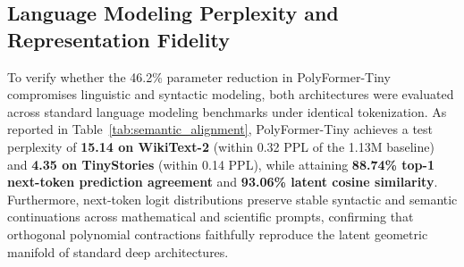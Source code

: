 \documentclass[journal,lettersize]{IEEEtran}
\begin{document}
\subsection{Language Modeling Perplexity and Representation Fidelity}
To verify whether the 46.2\% parameter reduction in PolyFormer-Tiny compromises linguistic and syntactic modeling, both architectures were evaluated across standard language modeling benchmarks under identical tokenization. As reported in Table~\ref{tab:semantic_alignment}, PolyFormer-Tiny achieves a test perplexity of \textbf{15.14 on WikiText-2} (within 0.32 PPL of the 1.13M baseline) and \textbf{4.35 on TinyStories} (within 0.14 PPL), while attaining \textbf{88.74\% top-1 next-token prediction agreement} and \textbf{93.06\% latent cosine similarity}. Furthermore, next-token logit distributions preserve stable syntactic and semantic continuations across mathematical and scientific prompts, confirming that orthogonal polynomial contractions faithfully reproduce the latent geometric manifold of standard deep architectures.

\begin{table}[h]
\centering
\caption{Downstream Language Modeling Perplexity \& Representation Alignment}
\label{tab:semantic_alignment}
\end{table}
\end{document}
